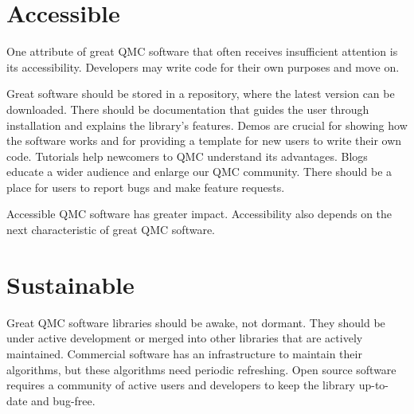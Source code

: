 \documentclass[graybox]{svmult}
\begin{document}
\section{Accessible} \label{CDHJS_sec:accessible}
One attribute of great QMC software that often receives insufficient attention is its accessibility.  Developers may write code for their own purposes and move on.

Great software should be stored in a repository, where the latest version can be downloaded.  There should be documentation that guides the user through installation and explains the library's features.  Demos are crucial for showing how the software works and for providing a template for new users to write their own code.  Tutorials help newcomers to QMC understand its advantages. Blogs educate a wider audience and enlarge our QMC community.  There should be a place for users to report bugs and make feature requests.

Accessible QMC software has greater impact.  Accessibility also depends on the next characteristic of great QMC software.


\section{Sustainable} \label{CDHJS_sec:sustainable}
Great QMC software libraries should be awake, not dormant.  They should be under active development or merged into other libraries that are actively maintained.  Commercial software has an infrastructure to maintain their algorithms, but these algorithms need periodic refreshing. Open source software requires a community of active users and developers to keep the library up-to-date and bug-free.
\end{document}
